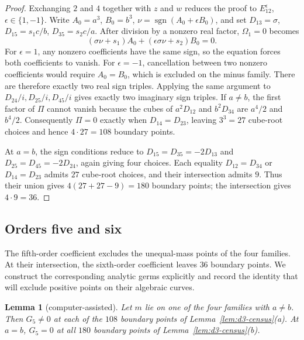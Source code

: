 \documentclass[Threeside,11pt]{article}
\newtheorem{lemma}[theorem]{Lemma}
\theoremstyle{definition}
\theoremstyle{remark}
\numberwithin{equation}{section}
\theoremstyle{remark}
\begin{document}
{\begin{proof}
Exchanging $2$ and $4$ together with $z$ and $w$ reduces the proof to
$E_{12}^{\epsilon}$, $\epsilon\in\{1,-1\}$.
Write $A_0=a^3$, $B_0=b^3$, $\nu=\operatorname{sgn}(A_0+\epsilon B_0)$,
and set $D_{13}=\sigma$, $D_{15}=s_1c/b$, $D_{35}=s_2c/a$.
After division by a nonzero real factor, $\Omega_1=0$ becomes
\[
 (\sigma\nu+s_1)A_0+(\epsilon\sigma\nu+s_2)B_0=0.
\]
For $\epsilon=1$, any nonzero coefficients have the same sign, so the equation
forces both coefficients to vanish. For $\epsilon=-1$, cancellation between two nonzero
coefficients would require $A_0=B_0$, which is excluded on the minus family.
There are therefore exactly two real sign triples. Applying the same argument
to $D_{24}/i,D_{25}/i,D_{45}/i$ gives exactly two imaginary sign triples.
If $a\ne b$, the first factor of $\Pi$ cannot vanish because the cubes of
$a^2D_{12}$ and $b^2D_{34}$ are $a^4/2$ and $b^4/2$.
Consequently $\Pi=0$ exactly when $D_{14}=D_{23}$, leaving $3^3=27$ cube-root
choices and hence $4\cdot27=108$ boundary points.

At $a=b$, the sign conditions reduce to
$D_{15}=D_{35}=-2D_{13}$ and $D_{25}=D_{45}=-2D_{24}$, again giving four choices.
Each equality $D_{12}=D_{34}$ or $D_{14}=D_{23}$ admits $27$ cube-root choices,
and their intersection admits $9$. Thus their union gives
$4(27+27-9)=180$ boundary points; the intersection gives $4\cdot9=36$.
\end{proof}

}\subsection{Orders five and six}

The fifth-order coefficient excludes the unequal-mass points of the four families.
At their intersection, the sixth-order coefficient leaves $36$ boundary points.
We construct the corresponding analytic germs explicitly and record the identity
that will exclude positive points on their algebraic curves.

\begin{lemma}[computer-assisted]\label{lem:d3-order5}
Let $m$ lie on one of the four families with $a\ne b$.  Then $G_5\neq0$ at each of the $108$
boundary points of Lemma~\ref{lem:d3-census}(a).  At $a=b$, $G_5=0$ at all $180$ boundary points of
Lemma~\ref{lem:d3-census}(b).
\end{lemma}
\end{document}
